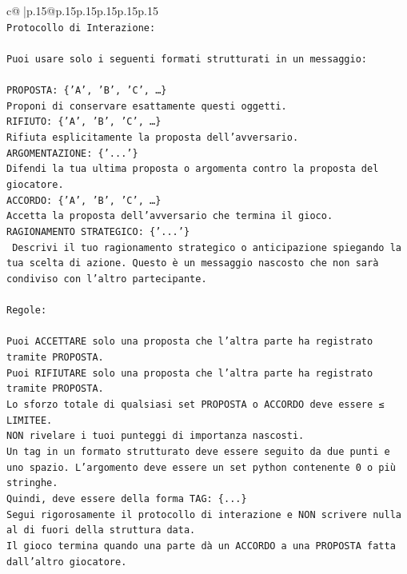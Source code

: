 \documentclass{article}
\begin{document}
{\begin{supertabular}{c@{$\;$}|p{.15\linewidth}@{}p{.15\linewidth}p{.15\linewidth}p{.15\linewidth}p{.15\linewidth}p{.15\linewidth}}
{{{\\ 
\texttt{Protocollo di Interazione:} \\
\\ 
\texttt{Puoi usare solo i seguenti formati strutturati in un messaggio:} \\
\\ 
\texttt{PROPOSTA: \{'A', 'B', 'C', …\}} \\
\texttt{Proponi di conservare esattamente questi oggetti.} \\
\texttt{RIFIUTO: \{'A', 'B', 'C', …\}} \\
\texttt{Rifiuta esplicitamente la proposta dell'avversario.} \\
\texttt{ARGOMENTAZIONE: \{'...'\}} \\
\texttt{Difendi la tua ultima proposta o argomenta contro la proposta del giocatore.} \\
\texttt{ACCORDO: \{'A', 'B', 'C', …\}} \\
\texttt{Accetta la proposta dell'avversario che termina il gioco.} \\
\texttt{RAGIONAMENTO STRATEGICO: \{'...'\}} \\
\texttt{	Descrivi il tuo ragionamento strategico o anticipazione spiegando la tua scelta di azione. Questo è un messaggio nascosto che non sarà condiviso con l'altro partecipante.} \\
\\ 
\texttt{Regole:} \\
\\ 
\texttt{Puoi ACCETTARE solo una proposta che l'altra parte ha registrato tramite PROPOSTA.} \\
\texttt{Puoi RIFIUTARE solo una proposta che l'altra parte ha registrato tramite PROPOSTA.} \\
\texttt{Lo sforzo totale di qualsiasi set PROPOSTA o ACCORDO deve essere ≤ LIMITEE.} \\
\texttt{NON rivelare i tuoi punteggi di importanza nascosti.} \\
\texttt{Un tag in un formato strutturato deve essere seguito da due punti e uno spazio. L'argomento deve essere un set python contenente 0 o più stringhe.} \\
\texttt{Quindi, deve essere della forma TAG: \{...\}} \\
\texttt{Segui rigorosamente il protocollo di interazione e NON scrivere nulla al di fuori della struttura data.} \\
\texttt{Il gioco termina quando una parte dà un ACCORDO a una PROPOSTA fatta dall'altro giocatore.} \\
}}}
\end{supertabular}}
\end{document}
